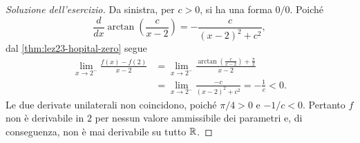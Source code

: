 \begin{proof}[Soluzione dell'esercizio]
Da sinistra, per \(c>0\), si ha una forma \(0/0\).
Poiché
\[
  \frac{d}{dx}\arctan\!\left(\frac{c}{x-2}\right)
  =-\frac{c}{(x-2)^2+c^2},
\]
dal \cref{thm:lez23-hopital-zero} segue
\[
\begin{aligned}
  \lim_{x\to2^-}\frac{f(x)-f(2)}{x-2}
  &=\lim_{x\to2^-}
    \frac{\arctan\!\left(\frac{c}{x-2}\right)+\frac\pi2}
         {x-2}\\
  &=\lim_{x\to2^-}\frac{-c}{(x-2)^2+c^2}
   =-\frac1c<0.
\end{aligned}
\]
Le due derivate unilaterali non coincidono, poiché
\(\pi/4>0\) e \(-1/c<0\). Pertanto \(f\)
non è derivabile in \(2\) per nessun valore
ammissibile dei parametri e, di conseguenza,
non è mai derivabile su tutto \(\mathbb{R}\).
\end{proof}

